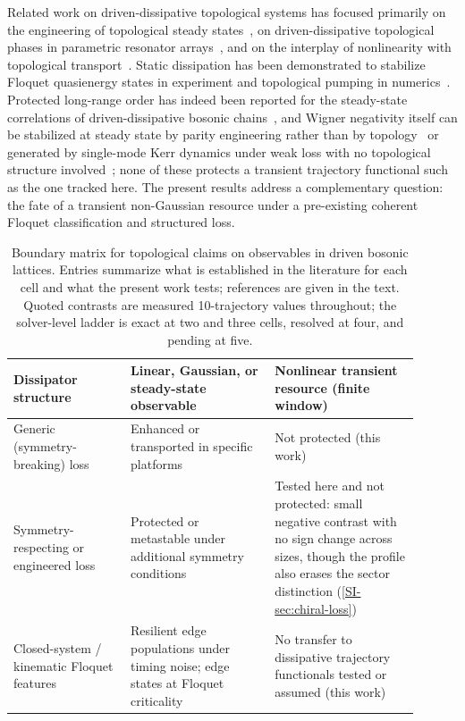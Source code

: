 \documentclass[aps,pra,preprint,superscriptaddress,amsmath,amssymb]{revtex4-2}
\begin{document}
Related work on driven-dissipative topological systems has focused primarily on the engineering of topological steady states~\cite{Diehl2011,Bardyn2013}, on driven-dissipative topological phases in parametric resonator arrays~\cite{GomezLeon2023resonator}, and on the interplay of nonlinearity with topological transport~\cite{Peano2016}. Static dissipation has been demonstrated to stabilize Floquet quasienergy states in experiment and topological pumping in numerics~\cite{Ritter2025autonomous}. Protected long-range order has indeed been reported for the steady-state correlations of driven-dissipative bosonic chains~\cite{ClaveroRubio2026}, and Wigner negativity itself can be stabilized at steady state by parity engineering rather than by topology~\cite{Liu2026} or generated by single-mode Kerr dynamics under weak loss with no topological structure involved~\cite{Raza2026}; none of these protects a transient trajectory functional such as the one tracked here. The present results address a complementary question: the fate of a transient non-Gaussian resource under a pre-existing coherent Floquet classification and structured loss.

\begin{table}[htpb]
  \centering
  \caption{Boundary matrix for topological claims on observables in driven bosonic lattices. Entries summarize what is established in the literature for each cell and what the present work tests; references are given in the text. Quoted contrasts are measured \num{10}-trajectory values throughout; the solver-level ladder is exact at two and three cells, resolved at four, and pending at five.}
  \label{tab:boundary}
  \begin{ruledtabular}
  \begin{tabular}{>{\raggedright\arraybackslash}p{0.26\linewidth}>{\raggedright\arraybackslash}p{0.32\linewidth}>{\raggedright\arraybackslash}p{0.32\linewidth}}
  Dissipator structure & Linear, Gaussian, or steady-state observable & Nonlinear transient resource (finite window) \\
  \hline
  Generic (symmetry-breaking) loss & Enhanced or transported in specific platforms~\cite{Li2024photonblockade,Perez2024domainwalls} & Not protected (this work) \\
  Symmetry-respecting or engineered loss & Protected or metastable under additional symmetry conditions~\cite{Diehl2011,Bardyn2013,YanayClerk2018,Paszko2024,Chirame2025} & Tested here and not protected: small negative contrast with no sign change across sizes, though the profile also erases the sector distinction (\cref{SI-sec:chiral-loss}) \\
  Closed-system / kinematic Floquet features & Resilient edge populations under timing noise; edge states at Floquet criticality~\cite{Bhargava2025,Zhou2025Floquet} & No transfer to dissipative trajectory functionals tested or assumed (this work) \\
  \end{tabular}
  \end{ruledtabular}
\end{table}
\end{document}
